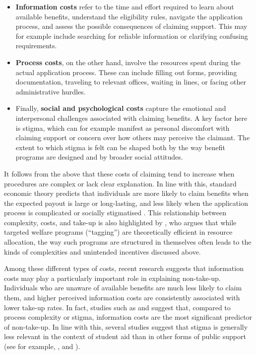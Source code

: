 \begin{itemize}
  \item \textbf{Information costs} refer to the time and effort required to learn about available benefits, understand the eligibility rules, navigate the application process, and assess the possible consequences of claiming support. This may for example include searching for reliable information or clarifying confusing requirements.
  \item \textbf{Process costs}, on the other hand, involve the resources spent during the actual application process. These can include filling out forms, providing documentation, traveling to relevant offices, waiting in lines, or facing other administrative hurdles.
  \item Finally, \textbf{social and psychological costs} capture the emotional and interpersonal challenges associated with claiming benefits. A key factor here is stigma, which can for example manifest as personal discomfort with claiming support or concern over how others may perceive the claimant. The extent to which stigma is felt can be shaped both by the way benefit programs are designed and by broader social attitudes.
\end{itemize}

It follows from the above that these costs of claiming tend to increase when procedures are complex or lack clear explanation. In line with this, standard economic theory predicts that individuals are more likely to claim benefits when the expected payout is large or long-lasting, and less likely when the application process is complicated or socially stigmatised \citep{janssens_totake_2022, booij_role_2012}. This relationship between complexity, costs, and take-up is also highlighted by \cite{akerlof_tagging_1978}, who argues that while targeted welfare programs (“tagging”) are theoretically efficient in resource allocation, the way such programs are structured in themselves often leads to the kinds of complexities and unintended incentives discussed above.

Among these different types of costs, recent research suggests that information costs may play a particularly important role in explaining non-take-up. Individuals who are unaware of available benefits are much less likely to claim them, and higher perceived information costs are consistently associated with lower take-up rates. In fact, studies such as \cite{bolland_information_nodate} and \cite{currie_takeup_2004} suggest that, compared to process complexity or stigma, information costs are the most significant predictor of non-take-up. In line with this, several studies suggest that stigma is generally less relevant in the context of student aid than in other forms of public support (see for example, \cite{konijn_quantifying_2023}, \cite{currie_takeup_2004} and \cite{bruckmeier_new_2012}).

